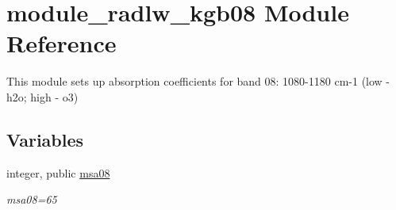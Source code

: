 \hypertarget{namespacemodule__radlw__kgb08}{}\section{module\+\_\+radlw\+\_\+kgb08 Module Reference}
\label{namespacemodule__radlw__kgb08}


This module sets up absorption coefficients for band 08\+: 1080-\/1180 cm-\/1 (low -\/ h2o; high -\/ o3)  


\subsection*{Variables}
\begin{DoxyCompactItemize}
\item 
\mbox{\label{namespacemodule__radlw__kgb08_a74e4bd8f4b00d0ff6bae1a39d9bddd3b}} 
integer, public \hyperlink{namespacemodule__radlw__kgb08_a74e4bd8f4b00d0ff6bae1a39d9bddd3b}{msa08}
\begin{DoxyCompactList}\small\item\em msa08=65 \end{DoxyCompactList}\end{DoxyCompactItemize}
